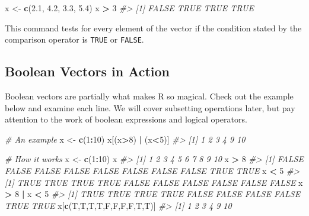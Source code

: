 \documentclass[
]{book}
\newenvironment{Shaded}{\begin{snugshade}}{\end{snugshade}}
\newcommand{\CommentTok}[1]{\textcolor[rgb]{0.56,0.35,0.01}{\textit{#1}}}
\newcommand{\DecValTok}[1]{\textcolor[rgb]{0.00,0.00,0.81}{#1}}
\newcommand{\FloatTok}[1]{\textcolor[rgb]{0.00,0.00,0.81}{#1}}
\newcommand{\KeywordTok}[1]{\textcolor[rgb]{0.13,0.29,0.53}{\textbf{#1}}}
\newcommand{\NormalTok}[1]{#1}
\newcommand{\OperatorTok}[1]{\textcolor[rgb]{0.81,0.36,0.00}{\textbf{#1}}}
\newcommand{\StringTok}[1]{\textcolor[rgb]{0.31,0.60,0.02}{#1}}
\begin{document}
\begin{Shaded}
\begin{Highlighting}[]
\NormalTok{x <-}\StringTok{ }\KeywordTok{c}\NormalTok{(}\FloatTok{2.1}\NormalTok{, }\FloatTok{4.2}\NormalTok{, }\FloatTok{3.3}\NormalTok{, }\FloatTok{5.4}\NormalTok{)}
\NormalTok{x }\OperatorTok{>}\StringTok{ }\DecValTok{3}
\CommentTok{#> [1] FALSE  TRUE  TRUE  TRUE}
\end{Highlighting}
\end{Shaded}

This command tests for every element of the vector if the condition stated by the comparison operator is \texttt{TRUE} or \texttt{FALSE}.

\hypertarget{boolean-vectors-in-action}{%
\subsection{Boolean Vectors in Action}\label{boolean-vectors-in-action}}

Boolean vectors are partially what makes R so magical. Check out the example below and examine each line. We will cover subsetting operations later, but pay attention to the work of boolean expressions and logical operators.

\begin{Shaded}
\begin{Highlighting}[]
\CommentTok{# An example}
\NormalTok{x <-}\StringTok{ }\KeywordTok{c}\NormalTok{(}\DecValTok{1}\OperatorTok{:}\DecValTok{10}\NormalTok{)}
\NormalTok{x[(x}\OperatorTok{>}\DecValTok{8}\NormalTok{) }\OperatorTok{|}\StringTok{ }\NormalTok{(x}\OperatorTok{<}\DecValTok{5}\NormalTok{)]}
\CommentTok{#> [1]  1  2  3  4  9 10}

\CommentTok{# How it works}
\NormalTok{x <-}\StringTok{ }\KeywordTok{c}\NormalTok{(}\DecValTok{1}\OperatorTok{:}\DecValTok{10}\NormalTok{)}
\NormalTok{x}
\CommentTok{#>  [1]  1  2  3  4  5  6  7  8  9 10}
\NormalTok{x }\OperatorTok{>}\StringTok{ }\DecValTok{8}
\CommentTok{#>  [1] FALSE FALSE FALSE FALSE FALSE FALSE FALSE FALSE  TRUE  TRUE}
\NormalTok{x }\OperatorTok{<}\StringTok{ }\DecValTok{5}
\CommentTok{#>  [1]  TRUE  TRUE  TRUE  TRUE FALSE FALSE FALSE FALSE FALSE FALSE}
\NormalTok{x }\OperatorTok{>}\StringTok{ }\DecValTok{8} \OperatorTok{|}\StringTok{ }\NormalTok{x }\OperatorTok{<}\StringTok{ }\DecValTok{5}
\CommentTok{#>  [1]  TRUE  TRUE  TRUE  TRUE FALSE FALSE FALSE FALSE  TRUE  TRUE}
\NormalTok{x[}\KeywordTok{c}\NormalTok{(T,T,T,T,F,F,F,F,T,T)]}
\CommentTok{#> [1]  1  2  3  4  9 10}
\end{Highlighting}
\end{Shaded}
\end{document}
